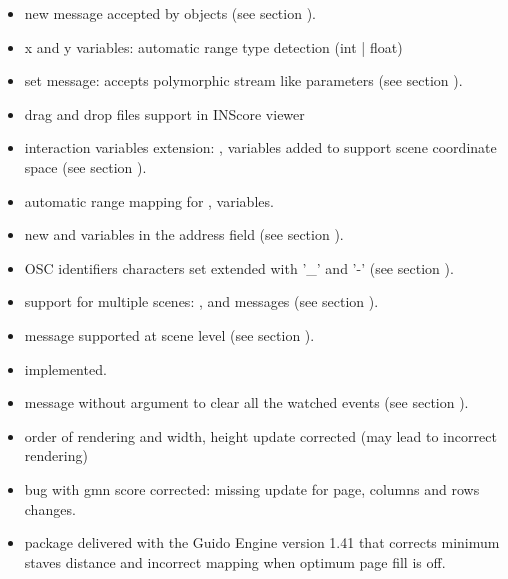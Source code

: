 \begin{itemize}
\item new  message accepted by  objects (see section ).
\item x and y variables: automatic range type detection (int | float)
\item set  message: accepts polymorphic stream like parameters (see section ).
\item drag and drop files support in INScore viewer
\item interaction variables extension: ,  variables added to support scene coordinate space (see section ).
\item automatic range mapping for ,  variables.
\item new  and  variables in the address field (see section ).
\item OSC identifiers characters set extended with '\_' and '-' (see section ).
\item support for multiple scenes: ,  and  messages (see section ).
\item {} message supported at scene level (see section ).
\item {} implemented.
\item {} message without argument to clear all the watched events (see section ).
\item order of rendering and width, height update corrected (may lead to incorrect rendering)
\item bug with gmn score corrected: missing update for page, columns and rows changes.
\item package delivered with the Guido Engine version 1.41 that corrects minimum staves distance and incorrect mapping when optimum page fill is off.
\end{itemize}

